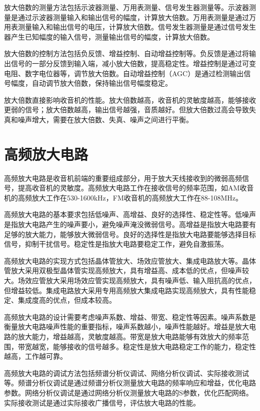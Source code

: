 \documentclass[12pt,UTF8]{ctexbook}
\begin{document}
放大倍数的测量方法包括示波器测量、万用表测量、信号发生器测量等。示波器测量是通过示波器测量输入和输出信号的幅度，计算放大倍数。万用表测量是通过万用表测量输入和输出信号的电压，计算放大倍数。信号发生器测量是通过信号发生器产生已知幅度的输入信号，测量输出信号的幅度，计算放大倍数。

放大倍数的控制方法包括负反馈、增益控制、自动增益控制等。负反馈是通过将输出信号的一部分反馈到输入端，减小放大倍数，提高稳定性。增益控制是通过可变电阻、数字电位器等，调节放大倍数。自动增益控制（AGC）是通过检测输出信号幅度，自动调节放大倍数，保持输出信号幅度稳定。

放大倍数直接影响收音机的性能。放大倍数越高，收音机的灵敏度越高，能够接收更弱的信号；放大倍数越高，输出信号越强，音质越好。但放大倍数过高会导致失真和噪声增大，需要在放大倍数、失真、噪声之间进行平衡。

\section{高频放大电路}

高频放大电路是收音机前端的重要组成部分，用于放大天线接收到的微弱高频信号，提高收音机的灵敏度。高频放大电路工作在接收信号的频率范围，如AM收音机的高频放大工作在530-1600kHz，FM收音机的高频放大工作在88-108MHz。

高频放大电路的基本要求包括低噪声、高增益、良好的选择性、稳定性等。低噪声是指放大电路产生的噪声要小，避免噪声淹没微弱信号。高增益是指放大电路要有足够的放大能力，能够放大微弱信号。良好的选择性是指放大电路要能够选择目标信号，抑制干扰信号。稳定性是指放大电路要稳定工作，避免自激振荡。

高频放大电路的实现方式包括晶体管放大、场效应管放大、集成电路放大等。晶体管放大采用双极型晶体管实现高频放大，具有增益高、成本低的优点，但噪声较大。场效应管放大采用场效应管实现高频放大，具有噪声低、输入阻抗高的优点，但增益较低。集成电路放大采用专用高频放大集成电路实现高频放大，具有性能稳定、集成度高的优点，但成本较高。

高频放大电路的设计需要考虑噪声系数、增益、带宽、稳定性等因素。噪声系数是衡量放大电路噪声性能的重要指标，噪声系数越小，噪声性能越好。增益是放大电路的放大能力，增益越高，灵敏度越高。带宽是放大电路能够有效放大的频率范围，带宽越宽，能够接收的信号越多。稳定性是放大电路稳定工作的能力，稳定性越高，工作越可靠。

高频放大电路的调试方法包括频谱分析仪调试、网络分析仪调试、实际接收测试等。频谱分析仪调试是通过频谱分析仪测量放大电路的频率响应和增益，优化电路参数。网络分析仪调试是通过网络分析仪测量放大电路的S参数，优化匹配网络。实际接收测试是通过实际接收广播信号，评估放大电路的性能。
\end{document}
